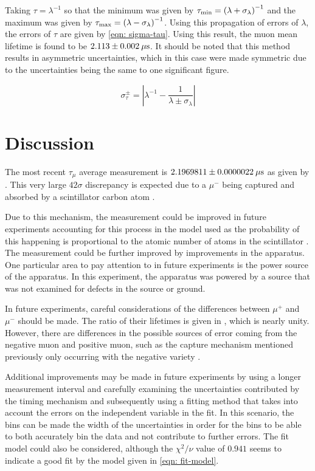 \documentclass[reprint]{revtex4-1}
\begin{document}
Taking $\tau = \lambda^{-1}$ so that the minimum was given by $\tau_{\rm{min}} = \left( \lambda + \sigma_{\lambda} \right)^{-1}$ and the maximum was given by $\tau_{\rm{max}} = \left( \lambda - \sigma_{\lambda} \right)^{-1}$. Using this propagation of errors of $\lambda$, the errors of $\tau$ are given by \cref{eqn: sigma-tau}. Using this result, the muon mean lifetime is found to be $2.113 \pm 0.002\:\rm{\mu s}$. It should be noted that this method results in asymmetric uncertainties, which in this case were made symmetric due to the uncertainties being the same to one significant figure.

\begin{equation}
\sigma_{\tau}^{\pm} = \left| \lambda^{-1} - \frac{1}{\lambda \pm \sigma_\lambda} \right|
\label{eqn: sigma-tau}
\end{equation}

\section{Discussion}
The most recent $\tau_{\mu}$ average measurement is $2.1969811 \pm 0.0000022\:\rm{\mu s}$ as given by \cite{PDG}. This very large $42\sigma$ discrepancy is expected due to a $\mu^{-}$ being captured and absorbed by a scintillator carbon atom \cite{Chitwood2007}.

Due to this mechanism, the measurement could be improved in future experiments accounting for this process in the model used as the probability of this happening is proportional to the atomic number of atoms in the scintillator \cite{Chitwood2007}. The measurement could be further improved by improvements in the apparatus. One particular area to pay attention to in future experiments is the power source of the apparatus. In this experiment, the apparatus was powered by a source that was not examined for defects in the source or ground.

In future experiments, careful considerations of the differences between $\mu^{+}$ and $\mu^{-}$ should be made. The ratio of their lifetimes is given in \cite{PDG}, which is nearly unity. However, there are differences in the possible sources of error coming from the negative muon and positive muon, such as the capture mechanism mentioned previously only occurring with the negative variety \cite{Coan2005}.

Additional improvements may be made in future experiments by using a longer measurement interval and carefully examining the uncertainties contributed by the timing mechanism and subsequently using a fitting method that takes into account the errors on the independent variable in the fit. In this scenario, the bins can be made the width of the uncertainties in order for the bins to be able to both accurately bin the data and not contribute to further errors. The fit model could also be considered, although the $\chi^2 / \nu$ value of $0.941$ seems to indicate a good fit by the model given in \cref{eqn: fit-model}.



\end{document}
